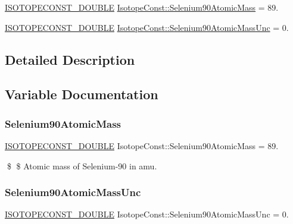 \begin{DoxyCompactItemize}
\item 
\mbox{\hyperlink{group___isotope_const-_macros_ga8f45a7272ce02c0b4c65c44636ed719a}{I\+S\+O\+T\+O\+P\+E\+C\+O\+N\+S\+T\+\_\+\+D\+O\+U\+B\+LE}} \mbox{\hyperlink{group___isotope_const-_selenium-_se90_ga1cc60c851084eb90f4fa9f7357c23436}{Isotope\+Const\+::\+Selenium90\+Atomic\+Mass}} = 89.
\item 
\mbox{\hyperlink{group___isotope_const-_macros_ga8f45a7272ce02c0b4c65c44636ed719a}{I\+S\+O\+T\+O\+P\+E\+C\+O\+N\+S\+T\+\_\+\+D\+O\+U\+B\+LE}} \mbox{\hyperlink{group___isotope_const-_selenium-_se90_gabc42bf1e5f326abcdc5c040b7d1691b1}{Isotope\+Const\+::\+Selenium90\+Atomic\+Mass\+Unc}} = 0.
\end{DoxyCompactItemize}


\subsection{Detailed Description}


\subsection{Variable Documentation}
\mbox{\label{group___isotope_const-_selenium-_se90_ga1cc60c851084eb90f4fa9f7357c23436}} 
\subsubsection{\texorpdfstring{Selenium90\+Atomic\+Mass}{Selenium90AtomicMass}}
{\footnotesize\ttfamily \mbox{\hyperlink{group___isotope_const-_macros_ga8f45a7272ce02c0b4c65c44636ed719a}{I\+S\+O\+T\+O\+P\+E\+C\+O\+N\+S\+T\+\_\+\+D\+O\+U\+B\+LE}} Isotope\+Const\+::\+Selenium90\+Atomic\+Mass = 89.}

\$ \$ Atomic mass of Selenium-\/90 in amu. \mbox{\label{group___isotope_const-_selenium-_se90_gabc42bf1e5f326abcdc5c040b7d1691b1}} 
\subsubsection{\texorpdfstring{Selenium90\+Atomic\+Mass\+Unc}{Selenium90AtomicMassUnc}}
{\footnotesize\ttfamily \mbox{\hyperlink{group___isotope_const-_macros_ga8f45a7272ce02c0b4c65c44636ed719a}{I\+S\+O\+T\+O\+P\+E\+C\+O\+N\+S\+T\+\_\+\+D\+O\+U\+B\+LE}} Isotope\+Const\+::\+Selenium90\+Atomic\+Mass\+Unc = 0.}

